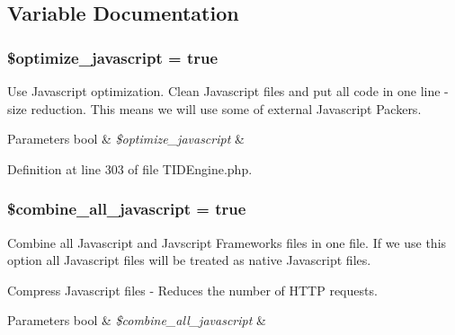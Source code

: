 \subsection{Variable Documentation}
\hypertarget{group__js__cache__settings_gaf2d235fefcbea23d664080143edad37f}{
\subsubsection[{\$optimize\_\-javascript}]{\setlength{\rightskip}{0pt plus 5cm}\$optimize\_\-javascript = true}}
\label{group__js__cache__settings_gaf2d235fefcbea23d664080143edad37f}
Use Javascript optimization. Clean Javascript files and put all code in one line -\/ size reduction. This means we will use some of external Javascript Packers.


\begin{DoxyParams}[1]{Parameters}
bool & {\em \$optimize\_\-javascript} & \\
\hline
\end{DoxyParams}


Definition at line 303 of file TIDEngine.php.

\hypertarget{group__js__cache__settings_ga73a53fbf95bca0dd45d7b6cca1f6a689}{
\subsubsection[{\$combine\_\-all\_\-javascript}]{\setlength{\rightskip}{0pt plus 5cm}\$combine\_\-all\_\-javascript = true}}
\label{group__js__cache__settings_ga73a53fbf95bca0dd45d7b6cca1f6a689}
Combine all Javascript and Javscript Frameworks files in one file. If we use this option all Javascript files will be treated as native Javascript files.\par
 Compress Javascript files -\/ Reduces the number of HTTP requests.


\begin{DoxyParams}[1]{Parameters}
bool & {\em \$combine\_\-all\_\-javascript} & \\
\hline
\end{DoxyParams}


